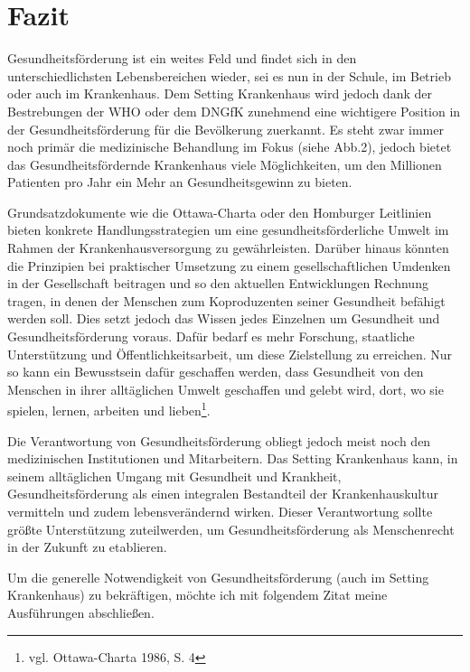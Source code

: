 \section{Fazit}
\label{sec:Fazit}

Gesundheitsförderung ist ein weites Feld und findet sich in den unterschiedlichsten Lebensbereichen wieder, sei es nun in der Schule, im Betrieb oder auch im Krankenhaus. Dem Setting Krankenhaus wird jedoch dank der Bestrebungen der WHO oder dem DNGfK zunehmend eine wichtigere Position in der Gesundheitsförderung für die Bevölkerung zuerkannt. Es steht zwar immer noch primär die medizinische Behandlung im Fokus (siehe Abb.2), jedoch bietet das Gesundheitsfördernde Krankenhaus viele Möglichkeiten, um den Millionen Patienten pro Jahr ein Mehr an Gesundheitsgewinn zu bieten. 

Grundsatzdokumente wie die Ottawa-Charta oder den Homburger Leitlinien bieten konkrete Handlungsstrategien um eine gesundheitsförderliche Umwelt im Rahmen der Krankenhausversorgung zu gewährleisten.  Darüber hinaus könnten die Prinzipien bei praktischer Umsetzung zu einem gesellschaftlichen Umdenken in der Gesellschaft beitragen und so den aktuellen Entwicklungen Rechnung tragen, in denen der Menschen zum Koproduzenten seiner Gesundheit befähigt werden soll. Dies setzt jedoch das Wissen jedes Einzelnen um Gesundheit und Gesundheitsförderung voraus. Dafür bedarf es mehr Forschung, staatliche Unterstützung und Öffentlichkeitsarbeit, um diese Zielstellung zu erreichen. Nur so kann ein Bewusstsein dafür geschaffen werden, dass Gesundheit von den Menschen in ihrer alltäglichen Umwelt geschaffen und gelebt wird, dort, wo sie spielen, lernen, arbeiten und lieben\footnote{vgl. Ottawa-Charta 1986, S. 4}. 

Die Verantwortung von Gesundheitsförderung obliegt jedoch meist noch den medizinischen Institutionen und Mitarbeitern. Das Setting Krankenhaus kann, in seinem alltäglichen Umgang mit Gesundheit und Krankheit, Gesundheitsförderung als einen integralen Bestandteil der Krankenhauskultur vermitteln und zudem lebensverändernd wirken. Dieser Verantwortung sollte größte Unterstützung zuteilwerden, um Gesundheitsförderung als Menschenrecht in der Zukunft zu etablieren. 

Um die generelle Notwendigkeit von Gesundheitsförderung (auch im Setting Krankenhaus) zu bekräftigen, möchte ich mit folgendem Zitat meine Ausführungen abschließen.

